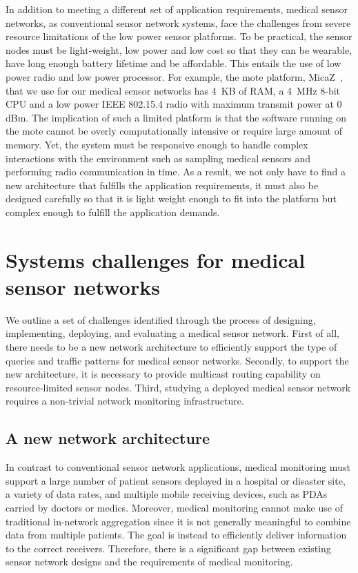 In addition to meeting a different set of application requirements, medical sensor
networks, as conventional sensor network systems, face the challenges from
severe
resource limitations of the low power sensor platforms. To be practical, the
sensor nodes must be light-weight, low power and low cost so that they can be
wearable, have long enough battery lifetime and be affordable. This entails
the use of low power radio and low power processor.  For example, the mote
platform, MicaZ~\cite{micaz}, that we use for our medical sensor networks has
4~KB of RAM, a 4~MHz 8-bit CPU and a low power IEEE 802.15.4 radio with
maximum transmit power at 0 dBm. The implication of such a limited platform is
that the software running on the mote cannot be overly computationally
intensive or require large amount of memory. Yet, the system must be responsive enough
to handle complex
interactions with the environment such as sampling medical sensors and
performing radio communication in time. As a result, we not only have to find
a new architecture that fulfills the application requirements, it must also be
designed carefully so that it is light weight enough to fit into the platform
but complex enough to fulfill the application demands. 

\section{Systems challenges for medical sensor networks}

We outline a set of challenges identified through the process of designing,
implementing, deploying, and evaluating a medical sensor network. First of
all, there needs to be a new network architecture to efficiently support the
type of queries and traffic patterns for medical sensor networks. Secondly,
to support the new architecture, it is necessary to provide multicast routing
capability on resource-limited sensor nodes. Third, studying a deployed
medical sensor network requires a non-trivial network monitoring infrastructure.

\subsection{A new network architecture}

In contrast to conventional sensor network applications, medical monitoring
must support a large number of patient sensors deployed in a hospital or
disaster site, a variety of data rates, and multiple mobile receiving
devices, such as PDAs carried by doctors or medics. Moreover, medical
monitoring cannot make use of traditional
in-network aggregation since it is not generally meaningful to combine data
from multiple patients. The goal is instead to efficiently deliver information
to the correct receivers. Therefore, there is a significant gap between
existing sensor network designs and the requirements of medical monitoring. 

